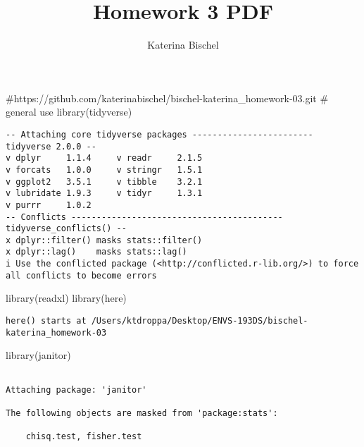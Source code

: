 \documentclass[
  letterpaper,
  DIV=11,
  numbers=noendperiod]{scrartcl}
\title{Homework 3 PDF}
\author{Katerina Bischel}
\date{}
\newenvironment{Shaded}{\begin{snugshade}}{\end{snugshade}}
\newcommand{\CommentTok}[1]{\textcolor[rgb]{0.37,0.37,0.37}{#1}}
\newcommand{\FunctionTok}[1]{\textcolor[rgb]{0.28,0.35,0.67}{#1}}
\newcommand{\NormalTok}[1]{\textcolor[rgb]{0.00,0.23,0.31}{#1}}
\begin{document}
\maketitle

\subsection{}\label{section}

\begin{Shaded}
\begin{Highlighting}[]
\CommentTok{\#https://github.com/katerinabischel/bischel{-}katerina\_homework{-}03.git}
\CommentTok{\# general use}
\FunctionTok{library}\NormalTok{(tidyverse)}
\end{Highlighting}
\end{Shaded}

\begin{verbatim}
-- Attaching core tidyverse packages ------------------------ tidyverse 2.0.0 --
v dplyr     1.1.4     v readr     2.1.5
v forcats   1.0.0     v stringr   1.5.1
v ggplot2   3.5.1     v tibble    3.2.1
v lubridate 1.9.3     v tidyr     1.3.1
v purrr     1.0.2     
-- Conflicts ------------------------------------------ tidyverse_conflicts() --
x dplyr::filter() masks stats::filter()
x dplyr::lag()    masks stats::lag()
i Use the conflicted package (<http://conflicted.r-lib.org/>) to force all conflicts to become errors
\end{verbatim}

\begin{Shaded}
\begin{Highlighting}[]
\FunctionTok{library}\NormalTok{(readxl)}
\FunctionTok{library}\NormalTok{(here)}
\end{Highlighting}
\end{Shaded}

\begin{verbatim}
here() starts at /Users/ktdroppa/Desktop/ENVS-193DS/bischel-katerina_homework-03
\end{verbatim}

\begin{Shaded}
\begin{Highlighting}[]
\FunctionTok{library}\NormalTok{(janitor)}
\end{Highlighting}
\end{Shaded}

\begin{verbatim}

Attaching package: 'janitor'

The following objects are masked from 'package:stats':

    chisq.test, fisher.test
\end{verbatim}
\end{document}

